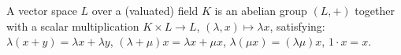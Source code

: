 A vector space $L$ over a (valuated) field $K$ is an abelian group $(L, +)$ together with a scalar multiplication $K \times L \to L$, $(\lambda, x) \mapsto \lambda x$, satisfying: $\lambda(x + y) = \lambda x + \lambda y$, $(\lambda + \mu)x = \lambda x + \mu x$, $\lambda(\mu x) = (\lambda \mu)x$, $1 \cdot x = x$.
